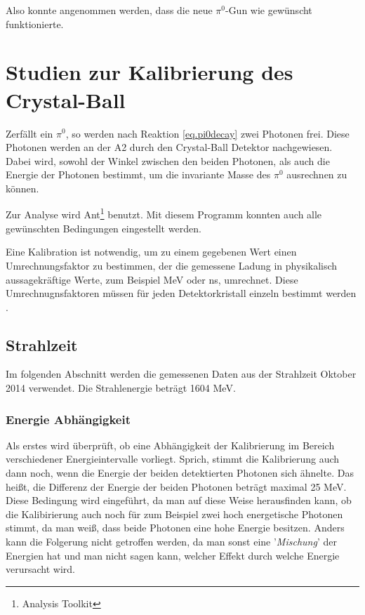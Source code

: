 \documentclass[a4paper,11pt,oneside,final,german,openbib,pdftex]{scrbook}
\begin{document}
{Also konnte angenommen werden, dass die neue $\pi^0$-Gun wie gewünscht funktionierte.











\chapter{Studien zur Kalibrierung des Crystal-Ball}

Zerf\"allt ein $\pi^0$, so werden nach Reaktion \ref{eq.pi0decay} zwei Photonen frei. Diese Photonen werden an der A2 durch den Crystal-Ball Detektor nachgewiesen. Dabei wird, sowohl der Winkel zwischen den beiden Photonen, als auch die Energie der Photonen bestimmt, um die invariante Masse des $\pi^0$ ausrechnen zu k\"onnen.

Zur Analyse wird Ant\footnote{Analysis Toolkit} benutzt. Mit diesem Programm konnten auch alle gew\"unschten Bedingungen eingestellt werden. 
\newline

Eine Kalibration ist notwendig, um zu einem gegebenen Wert einen Umrechnungsfaktor zu bestimmen, der die gemessene Ladung in physikalisch aussagekr\"aftige Werte, zum Beispiel MeV oder ns, umrechnet. Diese Umrechnugnsfaktoren m\"ussen f\"ur jeden Detektorkristall einzeln bestimmt werden \cite{Un08}.



\section{Strahlzeit}
\label{sec:Reelle-Daten}

Im folgenden Abschnitt werden die gemessenen Daten aus der Strahlzeit Oktober 2014 verwendet. Die Strahlenergie betr\"agt 1604 MeV. 

\subsection{Energie Abhängigkeit}
\label{sec:Energie-Interval-Abhaengigkeit}

Als erstes wird überprüft, ob eine Abhängigkeit der Kalibrierung im Bereich verschiedener Energieintervalle vorliegt. Sprich, stimmt die Kalibrierung auch dann noch, wenn die Energie der beiden detektierten Photonen sich ähnelte. Das hei{\ss}t, die Differenz der Energie der beiden Photonen betr\"agt maximal 25 MeV. Diese Bedingung wird eingef\"uhrt, da man auf diese Weise herausfinden kann, ob die Kalibirierung auch noch f\"ur zum Beispiel zwei hoch energetische Photonen stimmt, da man wei{\ss}, dass beide Photonen eine hohe Energie besitzen. Anders kann die Folgerung nicht getroffen werden, da man sonst eine '\textit{Mischung}' der Energien hat und man nicht sagen kann, welcher Effekt durch welche Energie verursacht wird.

}
\end{document}
